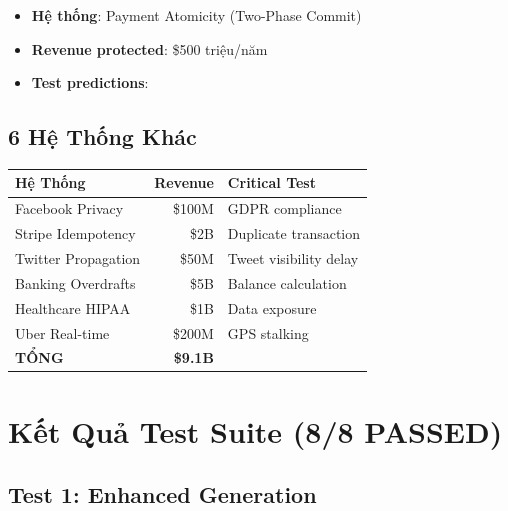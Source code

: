 \documentclass[12pt,a4paper]{report}
\begin{document}
\begin{itemize}
    \item \textbf{Hệ thống}: Payment Atomicity (Two-Phase Commit)
    \item \textbf{Revenue protected}: \$500 triệu/năm
    \item \textbf{Test predictions}:
\end{itemize}

\section{6 Hệ Thống Khác}

\begin{table}[h]
\centering
\begin{tabular}{|l|r|l|}
\hline
\textbf{Hệ Thống} & \textbf{Revenue} & \textbf{Critical Test} \\
\hline
Facebook Privacy & \$100M & GDPR compliance \\
Stripe Idempotency & \$2B & Duplicate transaction \\
Twitter Propagation & \$50M & Tweet visibility delay \\
Banking Overdrafts & \$5B & Balance calculation \\
Healthcare HIPAA & \$1B & Data exposure \\
Uber Real-time & \$200M & GPS stalking \\
\hline
\textbf{TỔNG} & \textbf{\$9.1B} & \\
\hline
\end{tabular}
\end{table}

\chapter{Kết Quả Test Suite (8/8 PASSED)}

\section{Test 1: Enhanced Generation}
\end{document}
